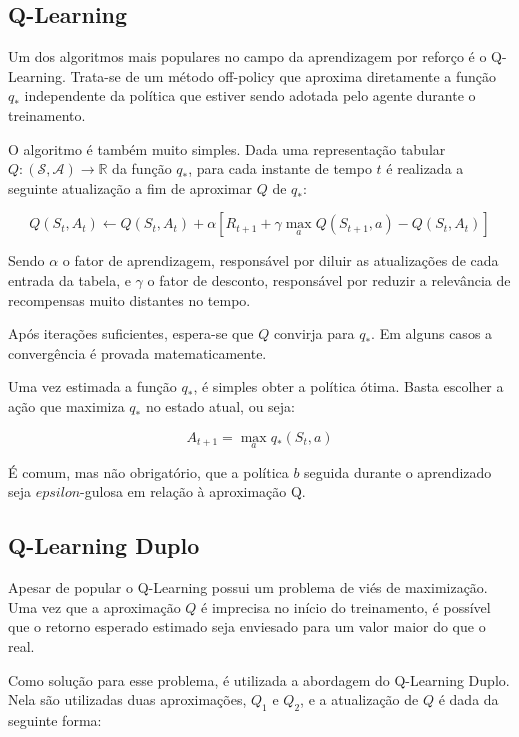 \subsection{Q-Learning}

Um dos algoritmos mais populares no campo da aprendizagem por reforço é o Q-Learning. Trata-se de um método off-policy que aproxima diretamente a função $q_*$ independente da política que estiver sendo adotada pelo agente durante o treinamento.

O algoritmo é também muito simples. Dada uma representação tabular $Q: (\mathcal{S},\mathcal{A}) \to \mathbb{R}$ da função $q_*$, para cada instante de tempo $t$ é realizada a seguinte atualização a fim de aproximar $Q$ de $q_*$:

\begin{equation}
Q(S_t, A_t) \leftarrow Q(S_t, A_t) + \alpha[R_{t+1} + \gamma\max_{a} Q(S_{t+1}, a) - Q(S_t, A_t)]
\end{equation}

Sendo $\alpha$ o fator de aprendizagem, responsável por diluir as atualizações de cada entrada da tabela, e $\gamma$ o fator de desconto, responsável por reduzir a relevância de recompensas muito distantes no tempo.

Após iterações suficientes, espera-se que $Q$ convirja para $q_*$. Em alguns casos a convergência é provada matematicamente.

Uma vez estimada a função $q_*$, é simples obter a política ótima. Basta escolher a ação que maximiza $q_*$ no estado atual, ou seja:

\begin{equation}
A_{t+1} = \max_{a} q_*(S_t, a)
\end{equation}

É comum, mas não obrigatório, que a política $b$ seguida durante o aprendizado seja $epsilon$-gulosa em relação à aproximação Q.

\subsection{Q-Learning Duplo}

Apesar de popular o Q-Learning possui um problema de viés de maximização. Uma vez que a aproximação $Q$ é imprecisa no início do treinamento, é possível que o retorno esperado estimado seja enviesado para um valor maior do que o real.

Como solução para esse problema, é utilizada a abordagem do Q-Learning Duplo. Nela são utilizadas duas aproximações, $Q_1$ e $Q_2$, e a atualização de $Q$ é dada da seguinte forma:

